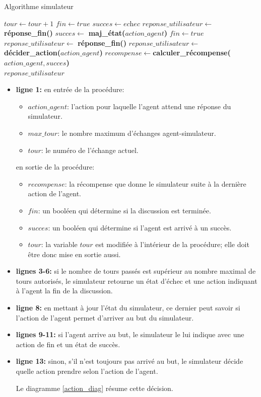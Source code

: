\begin{algorithm}[H]
	\caption{Algorithme simulateur}\label{euclid}
	\begin{algorithmic}[1]
		\State $tour \gets tour+1$
		\State $fin \gets \textit{true}$
		\State $succes \gets \textit{echec}$
		\State $reponse\_utilisateur \gets $ \textbf{réponse\_fin()}
		\Else
		\State $succes \gets$ \textbf{maj\_état(}$action\_agent$\textbf{)}
		\State $fin \gets \textit{true}$
		\State $reponse\_utilisateur \gets $ \textbf{réponse\_fin()}
		\Else 
		\State $reponse\_utilisateur \gets $ \textbf{décider\_action(}$action\_agent$\textbf{)}
		\EndIf
		\EndIf
		\State $recompense \gets $\textbf{calculer\_récompense(}$action\_agent, succes$\textbf{)}\\
		\Return $reponse\_utilisateur$
		\EndProcedure
		
	\end{algorithmic}
\end{algorithm}
\begin{itemize}
	\item \textbf{ligne 1:} en entrée de la procédure:
	\begin{itemize}
		\item $action\_agent$: l'action pour laquelle l'agent attend une réponse du simulateur.
		\item $max\_tour$: le nombre maximum d'échanges agent-simulateur.
		\item $tour$: le numéro de l'échange actuel.
	\end{itemize}
	en sortie de la procédure:
	\begin{itemize}
		\item $recompense$: la récompense que donne le simulateur suite à la dernière action de l'agent.
		\item $fin$: un booléen qui détermine si la discussion est terminée.
		\item $succes$: un booléen qui détermine si l'agent est arrivé à un succès.
		\item $tour$: la variable $tour$ est modifiée à l'intérieur de la procédure; elle doit être donc mise en sortie aussi.
	\end{itemize}
	\item \textbf{lignes 3-6:} si le nombre de tours passés est supérieur au nombre maximal de tours autorisés, le simulateur retourne un état d'échec et une action indiquant à l'agent la fin de la discussion.
	\item \textbf{ligne 8:} en mettant à jour l'état du simulateur, ce dernier peut savoir si l'action de l'agent permet d'arriver au but du simulateur.
	\item \textbf{lignes 9-11:} si l'agent arrive au but, le simulateur le lui indique avec une action de fin et un état de succès.
	\item \textbf{ligne 13:} sinon, s'il n'est toujours pas arrivé au but, le simulateur décide quelle action prendre selon l'action de l'agent.
	\par Le diagramme \ref{action_diag} résume cette décision.
\end{itemize}

